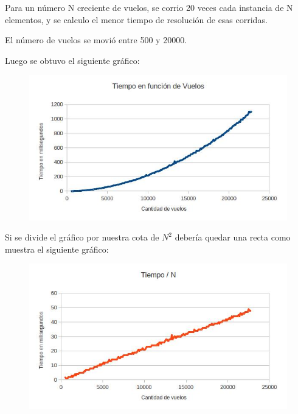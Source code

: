 Para un n\'umero N creciente de vuelos, se corrio 20 veces cada instancia de N elementos, y se calculo el menor tiempo de resoluci\'on de esas corridas.

El n\'umero de vuelos se movi\'o entre 500 y 20000.

Luego se obtuvo el siguiente gr\'afico:

\begin{figure}[ht]
	\begin{minipage}[t]{\linewidth}
		\centering
		\includegraphics[width=\textwidth]{GraficoDeVuelosYTiempo.jpg}
	\end{minipage}	
\end{figure}

\newpage
Si se divide el gr\'afico por nuestra cota de $N^{2}$ deber\'ia quedar una recta como muestra el siguiente gr\'afico:

\begin{figure}[ht]
	\begin{minipage}[t]{\linewidth}
		\centering
		\includegraphics[width=\textwidth]{GraficoDeVuelosPeorCasoDivididoN.jpg}
	\end{minipage}	
\end{figure}

